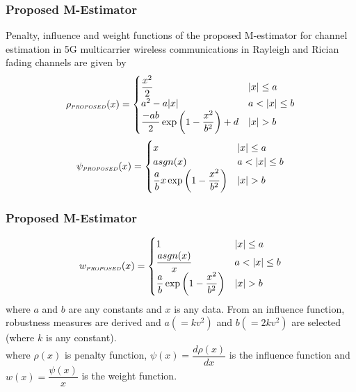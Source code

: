 \documentclass{beamer}
\begin{document}
\begin{frame}
\frametitle{Proposed M-Estimator}
Penalty, influence and weight functions of the proposed M-estimator for channel estimation in 5G multicarrier wireless 
communications in Rayleigh and Rician fading channels are given by
\begin{align}
    \rho_{\scaleto{PROPOSED}{3.5pt}}(x)= \begin{cases}   
    \dfrac{x^2}{2} &  \lvert x \rvert \leq a \\
    a^2-a\lvert x \rvert &  a <\lvert x \rvert \leq b\\
    \dfrac{-ab}{2} \exp\left(1- \dfrac{x^2}{b^2} \right) + d &  \lvert x \rvert>b
    \end{cases}
\end{align}
\begin{align}
    \psi_{\scaleto{PROPOSED}{3.5pt}}(x)= \begin{cases}   
    x &  \lvert x \rvert \leq a\\
    asgn(x)  &  a <\lvert x \rvert \leq b\\
    \dfrac{a}{b}x \exp\left(1- \dfrac{x^2}{b^2} \right) &  \lvert x \rvert>b
    \end{cases}
\end{align}

\end{frame}


\begin{frame}
\frametitle{Proposed M-Estimator}
\begin{align}
    \mathnormal{w}_{\scaleto{PROPOSED}{3.5pt}}(x)= \begin{cases}   
    1 &  \lvert x \rvert \leq a\\
    \dfrac{asgn(x)}{x} &  a <\lvert x \rvert \leq b\\
    \dfrac{a}{b} \exp\left(1- \dfrac{x^2}{b^2} \right) &  \lvert x \rvert>b
    \end{cases}
\end{align}
where $a$ and $b$ are any constants and $x$ is any data. From an influence function, robustness measures are derived and $a(=kv^2)$ and $b(=2kv^2)$ are selected (where $k$ is any constant).\\
where $\rho(x)$ is penalty function,  $\psi(x)=\dfrac{d\rho(x)}{dx}$ is the influence function and $w(x)=\dfrac {\psi(x)}{x}$ is the weight function. 
\end{frame}
\end{document}
